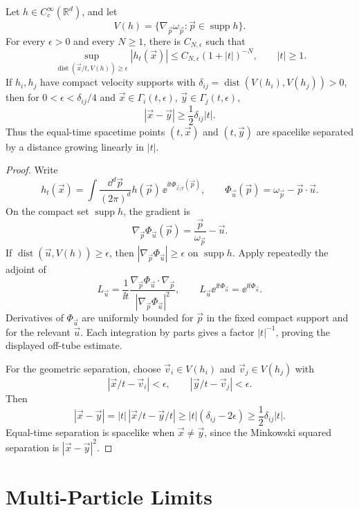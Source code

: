 \begin{proposition}
\label{prop:hr-velocity-tube-separation}
Let \(h\in C_c^\infty(\mathbb R^d)\), and let
\[
  V(h)=\{\nabla_{\vec p}\omega_{\vec p}:\vec p\in\operatorname{supp}h\}.
\]
For every \(\epsilon>0\) and every \(N\ge1\), there is \(C_{N,\epsilon}\) such
that
\[
  \sup_{\operatorname{dist}(\vec x/t,V(h))\ge\epsilon}
  |h_t(\vec x)|
  \le
  C_{N,\epsilon}(1+|t|)^{-N},
  \qquad |t|\ge1 .
\]
If \(h_i,h_j\) have compact velocity supports with
\(\delta_{ij}=\operatorname{dist}(V(h_i),V(h_j))>0\), then for
\(0<\epsilon<\delta_{ij}/4\) and
\(\vec x\in\Gamma_i(t,\epsilon)\), \(\vec y\in\Gamma_j(t,\epsilon)\),
\[
  |\vec x-\vec y|\ge \frac12\delta_{ij}|t|.
\]
Thus the equal-time spacetime points \((t,\vec x)\) and \((t,\vec y)\) are
spacelike separated by a distance growing linearly in \(|t|\).
\end{proposition}

\begin{proof}
Write
\[
  h_t(\vec x)
  =
  \int\frac{\dd^d\vec p}{(2\pi)^d}
  h(\vec p)\,
  \ee^{\ii t\Phi_{\vec x/t}(\vec p)},
  \qquad
  \Phi_{\vec u}(\vec p)=\omega_{\vec p}-\vec p\cdot\vec u .
\]
On the compact set \(\operatorname{supp}h\), the gradient is
\[
  \nabla_{\vec p}\Phi_{\vec u}(\vec p)
  =
  \frac{\vec p}{\omega_{\vec p}}-\vec u .
\]
If \(\operatorname{dist}(\vec u,V(h))\ge\epsilon\), then
\(|\nabla_{\vec p}\Phi_{\vec u}|\ge\epsilon\) on \(\operatorname{supp}h\).
Apply repeatedly the adjoint of
\[
  L_{\vec u}
  =
  \frac{1}{\ii t}
  \frac{\nabla_{\vec p}\Phi_{\vec u}\cdot\nabla_{\vec p}}
       {|\nabla_{\vec p}\Phi_{\vec u}|^2},
  \qquad
  L_{\vec u}\ee^{\ii t\Phi_{\vec u}}=\ee^{\ii t\Phi_{\vec u}} .
\]
Derivatives of \(\Phi_{\vec u}\) are uniformly bounded for \(\vec p\) in the
fixed compact support and for the relevant \(\vec u\).  Each integration by
parts gives a factor \(|t|^{-1}\), proving the displayed off-tube estimate.

For the geometric separation, choose
\(\vec v_i\in V(h_i)\) and \(\vec v_j\in V(h_j)\) with
\[
  |\vec x/t-\vec v_i|<\epsilon,\qquad
  |\vec y/t-\vec v_j|<\epsilon .
\]
Then
\[
  |\vec x-\vec y|
  =
  |t|\,|\vec x/t-\vec y/t|
  \ge
  |t|(\delta_{ij}-2\epsilon)
  \ge
  \frac12\delta_{ij}|t|.
\]
Equal-time separation is spacelike when \(\vec x\ne\vec y\), since the
Minkowski squared separation is \(|\vec x-\vec y|^2\).
\end{proof}

\section{Multi-Particle Limits}

